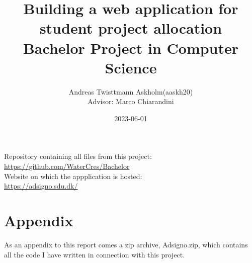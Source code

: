 \documentclass[a4paper,12pt]{article}
\title{
    Building a web application for student project allocation\\
    \large Bachelor Project in Computer Science}
\author{Andreas Twisttmann Askholm(aaskh20)\\{\small Advisor: Marco Chiarandini}}
\date{2023-06-01}
\begin{document}
\maketitle
\vspace{\fill}
\begin{centering}
Repository containing all files from this project:\\
\url{https://github.com/WaterCres/Bachelor}\\
Website on which the appplication is hosted:\\
\url{https://adsigno.sdu.dk/}

\end{centering}
\newpage
\tableofcontents
\clearpage
{}
\setcounter{page}{1}









\clearpage
{}


\newpage
\section*{Appendix}
As an appendix to this report comes a zip archive, Adsigno.zip, which contains all the code I have written in connection with this project.
\end{document}
